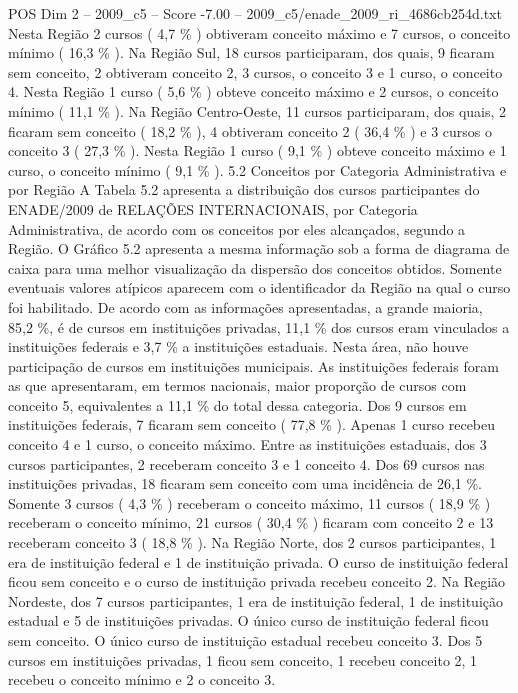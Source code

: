 \begin{textsample}{POS Dim 2 – 2009\_c5 – Score -7.00 – 2009\_c5/enade\_2009\_ri\_4686cb254d.txt}
Nesta Região 2 cursos ( 4,7 \% ) obtiveram conceito máximo e 7 cursos, o conceito mínimo ( 16,3 \% ).
Na Região Sul, 18 cursos participaram, dos quais, 9 ficaram sem conceito, 2 obtiveram conceito 2, 3 cursos, o conceito 3 e 1 curso, o conceito 4.
Nesta Região 1 curso ( 5,6 \% ) obteve conceito máximo e 2 cursos, o conceito mínimo ( 11,1 \% ).
Na Região Centro-Oeste, 11 cursos participaram, dos quais, 2 ficaram sem conceito ( 18,2 \% ), 4 obtiveram conceito 2 ( 36,4 \% ) e 3 cursos o conceito 3 ( 27,3 \% ).
Nesta Região 1 curso ( 9,1 \% ) obteve conceito máximo e 1 curso, o conceito mínimo ( 9,1 \% ). 5.2 Conceitos por Categoria Administrativa e por Região A Tabela 5.2 apresenta a distribuição dos cursos participantes do ENADE/2009 de RELAÇÕES INTERNACIONAIS, por Categoria Administrativa, de acordo com os conceitos por eles alcançados, segundo a Região.
O Gráfico 5.2 apresenta a mesma informação sob a forma de diagrama de caixa para uma melhor visualização da dispersão dos conceitos obtidos.
Somente eventuais valores atípicos aparecem com o identificador da Região na qual o curso foi habilitado.
De acordo com as informações apresentadas, a grande maioria, 85,2 \%, é de cursos em instituições privadas, 11,1 \% dos cursos eram vinculados a instituições federais e 3,7 \% a instituições estaduais.
Nesta área, não houve participação de cursos em instituições municipais.
As instituições federais foram as que apresentaram, em termos nacionais, maior proporção de cursos com conceito 5, equivalentes a 11,1 \% do total dessa categoria.
Dos 9 cursos em instituições federais, 7 ficaram sem conceito ( 77,8 \% ).
Apenas 1 curso recebeu conceito 4 e 1 curso, o conceito máximo.
Entre as instituições estaduais, dos 3 cursos participantes, 2 receberam conceito 3 e 1 conceito 4.
Dos 69 cursos nas instituições privadas, 18 ficaram sem conceito com uma incidência de 26,1 \%.
Somente 3 cursos ( 4,3 \% ) receberam o conceito máximo, 11 cursos ( 18,9 \% ) receberam o conceito mínimo, 21 cursos ( 30,4 \% ) ficaram com conceito 2 e 13 receberam conceito 3 ( 18,8 \% ).
Na Região Norte, dos 2 cursos participantes, 1 era de instituição federal e 1 de instituição privada.
O curso de instituição federal ficou sem conceito e o curso de instituição privada recebeu conceito 2.
Na Região Nordeste, dos 7 cursos participantes, 1 era de instituição federal, 1 de instituição estadual e 5 de instituições privadas.
O único curso de instituição federal ficou sem conceito.
O único curso de instituição estadual recebeu conceito 3.
Dos 5 cursos em instituições privadas, 1 ficou sem conceito, 1 recebeu conceito 2, 1 recebeu o conceito mínimo e 2 o conceito 3.

\end{textsample}
